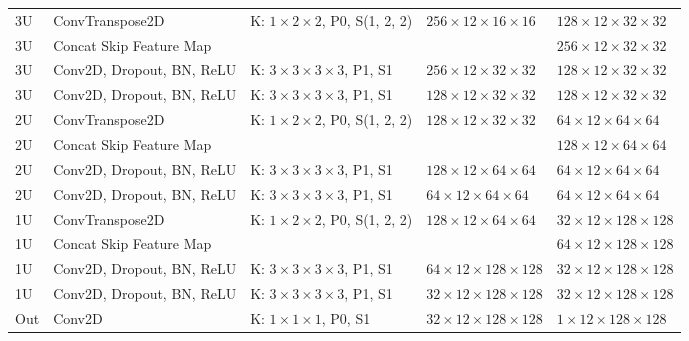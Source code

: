 \begin{sidewaystable}[htbp]
\begin{tabular}{l*{4}{l}}
      3U	& ConvTranspose2D			& K: $1 \times 2 \times 2$, P0, S(1, 2, 2)	& $256 \times 12 \times 16 \times 16$	& $128 \times 12 \times 32 \times 32$	\\
      3U	& Concat Skip Feature Map	&								&													& $256 \times 12 \times 32 \times 32$	\\
      3U	& Conv2D, Dropout, BN, ReLU & K: $3 \times 3 \times 3 \times 3$, P1, S1	& $256 \times 12 \times 32 \times 32$	& $128 \times 12 \times 32 \times 32$	\\
      3U	& Conv2D, Dropout, BN, ReLU & K: $3 \times 3 \times 3 \times 3$, P1, S1	& $128 \times 12 \times 32 \times 32$	& $128 \times 12 \times 32 \times 32$	\\
      2U	& ConvTranspose2D			& K: $1 \times 2 \times 2$, P0, S(1, 2, 2)	& $128 \times 12 \times 32 \times 32$	& $64 \times 12 \times 64 \times 64$	\\
      2U	& Concat Skip Feature Map	&								&													& $128 \times 12 \times 64 \times 64$	\\
      2U	& Conv2D, Dropout, BN, ReLU & K: $3 \times 3 \times 3 \times 3$, P1, S1	& $128 \times 12 \times 64 \times 64$	& $64 \times 12 \times 64 \times 64$	\\
      2U	& Conv2D, Dropout, BN, ReLU & K: $3 \times 3 \times 3 \times 3$, P1, S1	& $64 \times 12 \times 64 \times 64$	& $64 \times 12 \times 64 \times 64$	\\
      1U	& ConvTranspose2D			& K: $1 \times 2 \times 2$, P0, S(1, 2, 2)	& $128 \times 12 \times 64 \times 64$	& $32 \times 12 \times 128 \times 128$	\\
      1U	& Concat Skip Feature Map	&								&													& $64 \times 12 \times 128 \times 128$	\\
      1U	& Conv2D, Dropout, BN, ReLU & K: $3 \times 3 \times 3 \times 3$, P1, S1	& $64 \times 12 \times 128 \times 128$	& $32 \times 12 \times 128 \times 128$	\\
      1U	& Conv2D, Dropout, BN, ReLU & K: $3 \times 3 \times 3 \times 3$, P1, S1	& $32 \times 12 \times 128 \times 128$	& $32 \times 12 \times 128 \times 128$	\\
      
      Out	& Conv2D					& K: $1 \times 1 \times 1$, P0, S1			& $32 \times 12 \times 128 \times 128$	& $1 \times 12 \times 128 \times 128$	\\
      \bottomrule
   \end{tabular}
   \label{tab:architecture_fcnn_patches}
\end{sidewaystable}

